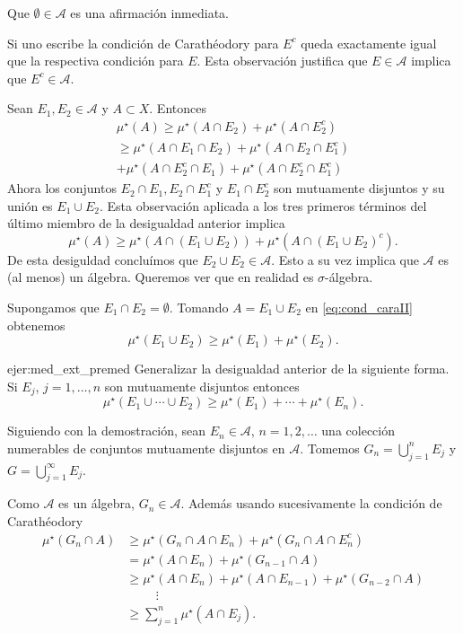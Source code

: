  \begin{demo} Que $\emptyset\in\mathscr{A}$ es una afirmación inmediata. 
 
 Si uno escribe la condición de Carathéodory para $E^c$ queda exactamente igual que la respectiva condición para $E$. Esta observación justifica que $E\in \mathscr{A}$ implica que $E^c\in\mathscr{A}$.
 
 Sean $E_1,E_2\in\mathscr{A}$ y $A\subset X$. Entonces
 \begin{multline*}
  \mu^\star(A)\geq  \mu^\star(A\cap E_2)+ \mu^\star(A\cap E_2^c)\\
  \geq \mu^\star(A\cap E_1\cap E_2)+ \mu^\star(A\cap E_2\cap E_1^c)\\
  + \mu^\star(A\cap E_2^c\cap E_1)+ \mu^\star(A\cap E_2^c\cap E_1^c)
 \end{multline*} 
Ahora los conjuntos $E_2\cap E_1, E_2\cap E_1^c$ y $E_1\cap E_2^c$ son mutuamente disjuntos  y su unión es $E_1\cup E_2$. Esta observación aplicada a los tres primeros términos del último miembro de la desigualdad anterior implica
\[
  \mu^\star(A)\geq \mu^\star(A\cap (E_1\cup E_2))+ \mu^\star(A\cap (E_1\cup E_2)^c).
\]
De esta desiguldad concluímos que $E_2\cup E_2\in\mathscr{A}$. Esto a su vez implica que $\mathscr{A}$ es (al menos) un álgebra. Queremos ver que en realidad es $\sigma$-álgebra.

Supongamos que $E_1\cap E_2=\emptyset$. Tomando $A= E_1\cup E_2$ en \eqref{eq:cond_caraII} obtenemos
\[
 \mu^\star(E_1\cup E_2)\geq \mu^\star(E_1)+\mu^\star(E_2).
 \]

\begin{ejercicio}{ejer:med_ext_premed} Generalizar la desigualdad anterior de la siguiente forma. Si $E_j$, $j=1,\ldots,n$ son mutuamente disjuntos entonces
\[
 \mu^\star(E_1\cup\cdots\cup E_2)\geq \mu^\star(E_1)+\cdots+\mu^\star(E_n).
 \]
 \end{ejercicio}

Siguiendo con la demostración, sean $E_n\in\mathscr{A}$, $n=1,2,\ldots$ una colección numerables de conjuntos mutuamente disjuntos en $\mathscr{A}$. Tomemos $G_n=\bigcup_{j=1}^nE_j$ y $G=\bigcup_{j=1}^{\infty}E_j$.

Como $\mathscr{A}$ es un álgebra, $G_n\in\mathscr{A}$. Además usando sucesivamente la condición de Carathéodory
\begin{equation}\label{eq:dem_cara1}
\begin{split}
  \mu^\star(G_n\cap A) &\geq  \mu^\star(G_n\cap A\cap E_n)+ \mu^\star(G_n\cap A\cap E_n^c)\\
 &=\mu^\star( A\cap E_n)+ \mu^\star(G_{n-1}\cap A)\\
 &\geq \mu^\star( A\cap E_n)+ \mu^\star(A\cap E_{n-1})+ \mu^\star(G_{n-2}\cap A)\\
&\hspace{1cm}\vdots\\
&\geq \sum_{j=1}^n\mu^\star(A\cap E_j).
\end{split}
\end{equation}


\end{demo}
